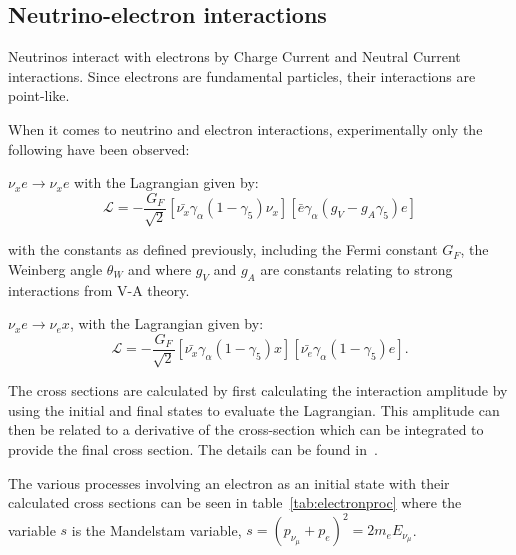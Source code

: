 \subsection{Neutrino-electron interactions}



Neutrinos interact with electrons by Charge Current and Neutral Current interactions. Since electrons are fundamental particles, their interactions are point-like.

When it comes to neutrino and electron interactions, experimentally only the following have been observed:

$\nu_x e \rightarrow \nu_x e$ with the Lagrangian given by:
\begin{equation}
\mathcal{L}=-\frac{G_F}{\sqrt{2}} \left[ \bar{\nu_x}\gamma_\alpha (1-\gamma_5)\nu_x \right] \left[ \bar{e} \gamma_\alpha (g_V-g_A \gamma_5)e \right]
\end{equation}

with the constants as defined previously, including the Fermi constant $G_F$, the Weinberg angle $\theta_W$ and where $g_V$ and $g_A$ are constants relating to strong interactions from V-A theory.

$\nu_x e \rightarrow \nu_e x$, with the Lagrangian given by:
\begin{equation}
\mathcal{L}=-\frac{G_F}{\sqrt{2}} \left[ \bar{\nu_x}\gamma_\alpha (1-\gamma_5)x\right] \left[ \bar{\nu_e}\gamma_\alpha (1-\gamma_5)e \right].
\end{equation}

The cross sections are calculated by first calculating the  interaction amplitude by using the initial and final states to evaluate the Lagrangian. This amplitude can then be related to a derivative of the cross-section which can be integrated to provide the final cross section. The details can be found in~\cite{3Peskin}.

The various processes involving an electron as an initial state with their calculated cross sections can be seen in table~\ref{tab:electronproc} where the variable $s$ is the Mandelstam variable, $s=(p_{\nu_\mu} + p_e)^2 = 2m_e E_{\nu_\mu}$.

